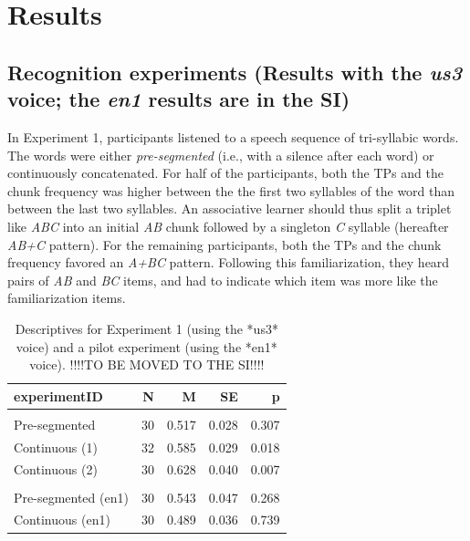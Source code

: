 \documentclass[
]{article}
\begin{document}
\clearpage

\hypertarget{results}{%
\section{Results}\label{results}}

\hypertarget{recognition-experiments-results-with-the-us3-voice-the-en1-results-are-in-the-si}{%
\subsection{\texorpdfstring{Recognition experiments (Results with the
\emph{us3} voice; the \emph{en1} results are in the
SI)}{Recognition experiments (Results with the us3 voice; the en1 results are in the SI)}}\label{recognition-experiments-results-with-the-us3-voice-the-en1-results-are-in-the-si}}

In Experiment 1, participants listened to a speech sequence of
tri-syllabic words. The words were either \emph{pre-segmented} (i.e.,
with a silence after each word) or continuously concatenated. For half
of the participants, both the TPs and the chunk frequency was higher
between the the first two syllables of the word than between the last
two syllables. An associative learner should thus split a triplet like
\emph{ABC} into an initial \emph{AB} chunk followed by a singleton
\emph{C} syllable (hereafter \emph{AB+C} pattern). For the remaining
participants, both the TPs and the chunk frequency favored an
\emph{A+BC} pattern. Following this familiarization, they heard pairs of
\emph{AB} and \emph{BC} items, and had to indicate which item was more
like the familiarization items.

\begin{table}

\caption{\label{tab:stats-london-descriptives}Descriptives for Experiment 1 (using the *us3* voice) and a pilot experiment (using the *en1* voice). !!!!TO BE MOVED TO THE SI!!!!}
\centering
\begin{tabular}[t]{lrrrr}
\toprule
experimentID & N & M & SE & p\\
\midrule
\addlinespace[0.3em]
\multicolumn{5}{l}{\textbf{us2}}\\
\hspace{1em}Pre-segmented & 30 & 0.517 & 0.028 & 0.307\\
\hspace{1em}Continuous (1) & 32 & 0.585 & 0.029 & 0.018\\
\hspace{1em}Continuous (2) & 30 & 0.628 & 0.040 & 0.007\\
\addlinespace[0.3em]
\multicolumn{5}{l}{\textbf{en1}}\\
\hspace{1em}Pre-segmented (en1) & 30 & 0.543 & 0.047 & 0.268\\
\hspace{1em}Continuous (en1) & 30 & 0.489 & 0.036 & 0.739\\
\bottomrule
\end{tabular}
\end{table}
\end{document}
